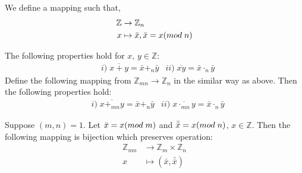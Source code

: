 \documentclass[10pt,a4paper]{article}
\begin{document}
\begin{mydef}
We define a mapping such that,
\begin{align*}
\mathbb{Z}&\rightarrow\mathbb{Z}_n \\
x&\mapsto\bar{x},\bar{x}=x(mod\;n)
\end{align*}
\end{mydef}

\begin{theorem}
The following properties hold for $x,\,y\in\mathbb{Z}$:
\begin{align*}
&i)\;\overline{x+y}=\bar{x}+_n\bar{y}
&ii)\;\overline{xy}=\bar{x}\cdot_n\bar{y}
\end{align*}
Define the following mapping from $\mathbb{Z}_{mn}\rightarrow\mathbb{Z}_n$ in the similar way as above. Then the following properties hold:
\begin{align*}
&i)\;\overline{x+_{mn}y}=\bar{x}+_n\bar{y}
&ii)\;\overline{x\cdot_{mn}y}=\bar{x}\cdot_n\bar{y}
\end{align*}
\end{theorem}

\begin{theorem}
Suppose $(m,n)=1$. Let $\bar{x}=x(mod\;m)$ and $\bar{\bar{x}}=x(mod\;n)$, $x\in\mathbb{Z}.$ Then the following mapping is bijection which preserves operation:
\begin{align*}
\mathbb{Z}_{mn} &\rightarrow\mathbb{Z}_m\times\mathbb{Z}_n \\
x&\mapsto(\bar{x},\bar{\bar{x}})
\end{align*}
\end{theorem}
\end{document}
